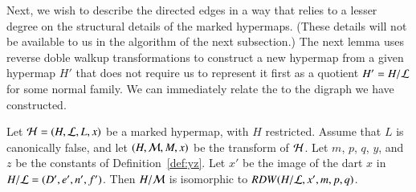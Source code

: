 %

Next, we wish to describe the directed edges in a way that relies to a
lesser degree on the structural details of the marked hypermaps.
(These details will not be available to us in the algorithm of the
next subsection.)  The next lemma uses reverse doble walkup
transformations to construct a new hypermap from a given hypermap $H'$
that does not require us to represent it first as a quotient $H' =
H/{\cal L}$ for some normal family.
We can immediately relate the to the digraph we
have constructed.   

\begin{lemma}\label{lemma:RDW}
Let ${\cal H} =(H,{\cal L},L,x)$ be a marked hypermap,
  with $H$ restricted.  Assume that $L$ is canonically false, and let 
$(H,{\cal{M}},M,x)$ be 
  the transform of $\cal H$.   
Let $m$, $p$, $q$, $y$, and $z$ be
  the constants of Definition~\ref{def:yz}.  Let $x'$ be the
  image of the dart $x$ in $H/{\cal L} = (D',e',n',f')$.
Then $H/{\cal M}$ is isomorphic to $RDW(H/{\cal{L}},x',m,p,q)$.
\end{lemma}


